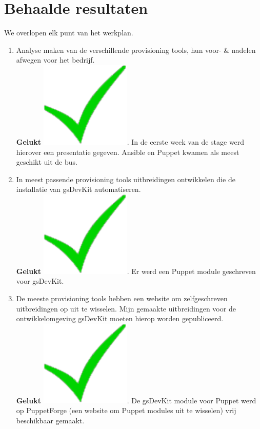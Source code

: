 \documentclass[a4paper,11pt]{article}
\theoremstyle{definition}
\begin{document}
\section{Behaalde resultaten}
We overlopen elk punt van het werkplan.
\begin{enumerate}
\item Analyse maken van de verschillende provisioning tools, hun voor- & nadelen afwegen voor het 
bedrijf.\\

\noindent \textbf{Gelukt} \includegraphics[scale=0.15]{gelukt.pdf}. In de eerste week van de stage werd hierover een 
presentatie gegeven. Ansible en Puppet kwamen als meest geschikt uit de bus. 
\item In meest passende provisioning tools uitbreidingen ontwikkelen die de installatie van gsDevKit 
automatiseren.\\

\noindent \textbf{Gelukt} \includegraphics[scale=0.15]{gelukt.pdf}. Er werd een 
Puppet module geschreven voor gsDevKit.

\item  De meeste provisioning tools hebben een website om zelfgeschreven uitbreidingen op uit te wisselen. 
Mijn gemaakte uitbreidingen voor de ontwikkelomgeving gsDevKit moeten hierop worden 
gepubliceerd.\\

\noindent \textbf{Gelukt} \includegraphics[scale=0.15]{gelukt.pdf}. De gsDevKit 
module voor Puppet werd op PuppetForge (een website om Puppet modules uit te wisselen) vrij beschikbaar gemaakt.


\end{enumerate}
\end{document}
